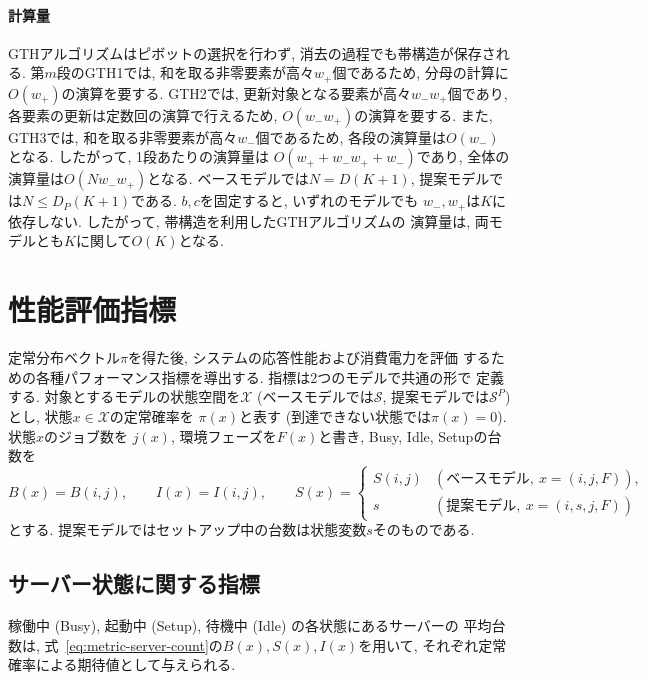 \documentclass[a4paper, 11pt, dvipdfmx]{jsreport}
\begin{document}
\paragraph{計算量}
GTHアルゴリズムはピボットの選択を行わず, 消去の過程でも帯構造が保存される\cite{GrassmannTaksarHeyman1985}.
第$m$段のGTH1では, 和を取る非零要素が高々$w_+$個であるため, 分母の計算に$O(w_+)$の演算を要する.
GTH2では, 更新対象となる要素が高々$w_-w_+$個であり, 各要素の更新は定数回の演算で行えるため, $O(w_-w_+)$の演算を要する. また, GTH3では, 和を取る非零要素が高々$w_-$個であるため, 各段の演算量は$O(w_-)$となる. したがって, 1段あたりの演算量は
$O(w_+ + w_-w_+ + w_-)$であり, 全体の演算量は$O(Nw_-w_+)$となる.
ベースモデルでは$N=D(K+1)$,
提案モデルでは$N\le D_P(K+1)$である.
$b,c$を固定すると, いずれのモデルでも
$w_-,w_+$は$K$に依存しない.
したがって, 帯構造を利用したGTHアルゴリズムの
演算量は, 両モデルとも$K$に関して$O(K)$となる.

\section{性能評価指標}
\label{sec:performance_metrics}

定常分布ベクトル$\pi$を得た後, システムの応答性能および消費電力を評価
するための各種パフォーマンス指標を導出する. 指標は2つのモデルで共通の形で
定義する. 対象とするモデルの状態空間を$\mathcal{X}$ (ベースモデルでは$\mathcal{S}$, 
提案モデルでは$\mathcal{S}^{P}$) とし, 状態$x \in \mathcal{X}$の定常確率を
$\pi(x)$と表す (到達できない状態では$\pi(x) = 0$). 状態$x$のジョブ数を
$j(x)$, 環境フェーズを$F(x)$と書き, Busy, Idle, Setupの台数を
\begin{equation}
    B(x) = B(i, j), \qquad I(x) = I(i, j), \qquad
    S(x) =
    \begin{cases}
        S(i, j) & (\text{ベースモデル}, \ x = (i, j, F)), \\
        s      & (\text{提案モデル}, \ x = (i, s, j, F))
    \end{cases}
    \label{eq:metric-server-count}
\end{equation}
とする. 提案モデルではセットアップ中の台数は状態変数$s$そのものである. 

\subsection{サーバー状態に関する指標}
\label{sec:metric-server}

稼働中 (Busy), 起動中 (Setup), 待機中 (Idle) の各状態にあるサーバーの
平均台数は, 式~\eqref{eq:metric-server-count}の$B(x), S(x), I(x)$を用いて, 
それぞれ定常確率による期待値として与えられる. 
\end{document}
